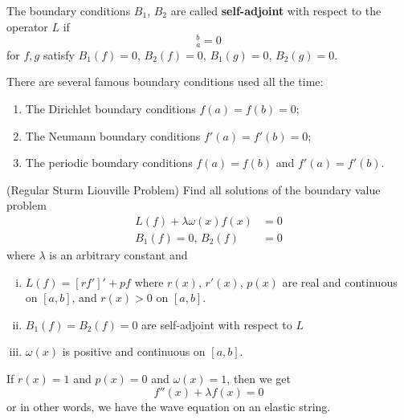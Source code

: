 \begin{defn}
The boundary conditions $B_1$, $B_2$ are called
\textbf{self-adjoint} with respect to the operator $L$ if
\begin{equation}
[r(x)(f'(x)\overline{g(x)}-f(x)\overline{g'(x)})]^{b}_{a}=0
\end{equation}
for $f,g$ satisfy $B_{1}(f)=0$, $B_{2}(f)=0$, $B_{1}(g)=0$, $B_{2}(g)=0$.
\end{defn}
\begin{ex}
There are several famous boundary conditions used all the
time:
\begin{enumerate}
\item{} The
Dirichlet boundary conditions $f(a)=f(b)=0$;
\item{} The
Neumann boundary conditions $f'(a)=f'(b)=0$;
\item{} The
periodic boundary conditions $f(a)=f(b)$ and $f'(a)=f'(b)$.
\end{enumerate}
\end{ex}
\begin{defn}{(Regular Sturm Liouville Problem)}
Find all solutions of the boundary value problem
\begin{align*}
L(f) + \lambda\omega(x)f(x) &= 0\\
B_{1}(f)=0,\, B_{2}(f)&=0
\end{align*}
where $\lambda$ is an arbitrary constant and
\begin{enumerate}[i)]
\item $L(f)=[rf']'+pf$ where $r(x)$, $r'(x)$, $p(x)$ are
  real and continuous on $[a,b]$, and $r(x)>0$ on $[a,b]$.
\item $B_{1}(f)=B_{2}(f)=0$ are self-adjoint with respect to
  $L$
\item $\omega(x)$ is positive and continuous on $[a,b]$.
\end{enumerate}
\end{defn}
\begin{rmk}
If $r(x)=1$ and $p(x)=0$ and $\omega(x)=1$, then we get
\begin{equation}
f''(x)+\lambda f(x)=0
\end{equation}
or in other words, we have the wave equation on an elastic string.
\end{rmk}
